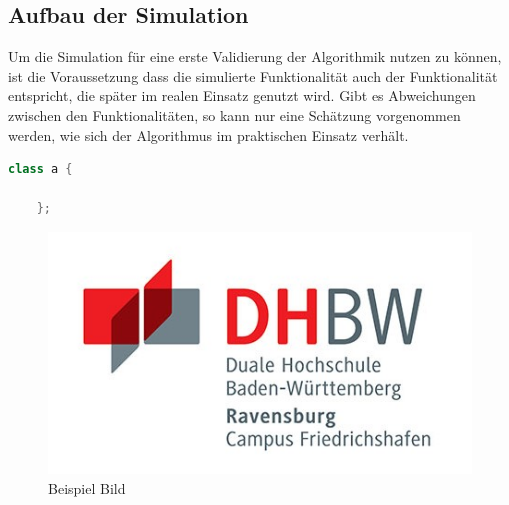 \subsection{Aufbau der Simulation}
Um die Simulation für eine erste Validierung der Algorithmik nutzen zu können, ist die Voraussetzung dass die simulierte Funktionalität auch der Funktionalität entspricht, die später im realen Einsatz genutzt wird.
Gibt es Abweichungen zwischen den Funktionalitäten, so kann nur eine Schätzung vorgenommen werden, wie sich der Algorithmus im praktischen Einsatz verhält. \\

\begin{lstlisting}[language=C++, caption=Beispiel Listing]
    class a {

    };
\end{lstlisting}

\begin{figure}[H]
    \centering
    \includegraphics[]{graphics/DHBW_logo.jpg}
    \caption{Beispiel Bild}
    \label{fig:bsp_bild}
\end{figure}

\newpage

